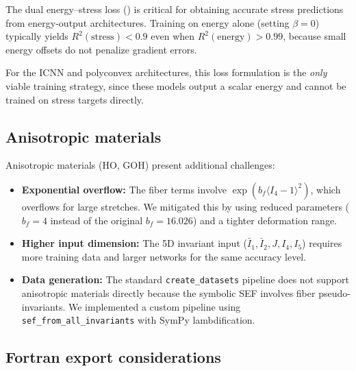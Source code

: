The dual energy--stress loss () is critical for
obtaining accurate stress predictions from energy-output architectures.
Training on energy alone (setting $\beta = 0$) typically yields
$R^2(\text{stress}) < 0.9$ even when $R^2(\text{energy}) > 0.99$, because
small energy offsets do not penalize gradient errors.

For the ICNN and polyconvex architectures, this loss formulation is the
\emph{only} viable training strategy, since these models output a scalar
energy and cannot be trained on stress targets directly.


\subsection{Anisotropic materials}
\label{sec:discussion:anisotropic}

Anisotropic materials (HO, GOH) present additional challenges:
\begin{itemize}
  \item \textbf{Exponential overflow:} The fiber terms involve
    $\exp(b_f\langle I_4 - 1\rangle^2)$, which overflows for large stretches.
    We mitigated this by using reduced parameters ($b_f = 4$ instead of the
    original $b_f = 16.026$) and a tighter deformation range.
  \item \textbf{Higher input dimension:} The 5D invariant input
    ($\bar{I}_1, \bar{I}_2, J, I_4, I_5$) requires more training data and
    larger networks for the same accuracy level.
  \item \textbf{Data generation:} The standard \texttt{create\_datasets}
    pipeline does not support anisotropic materials directly because the
    symbolic SEF involves fiber pseudo-invariants.  We implemented a custom
    pipeline using \texttt{sef\_from\_all\_invariants} with SymPy
    lambdification.
\end{itemize}


\subsection{Fortran export considerations}
\label{sec:discussion:fortran}

